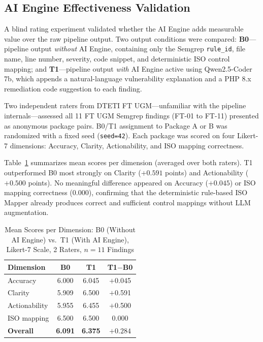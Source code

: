 \documentclass[conference]{IEEEtran}
\begin{document}
\subsection{AI Engine Effectiveness Validation}

A blind rating experiment validated whether the AI Engine adds
measurable value over the raw pipeline output. Two output conditions
were compared: \textbf{B0}---pipeline output \emph{without} AI
Engine, containing only the Semgrep \texttt{rule\_id}, file name,
line number, severity, code snippet, and deterministic ISO control
mapping; and \textbf{T1}---pipeline output \emph{with} AI Engine
active using Qwen2.5-Coder 7b, which appends a natural-language
vulnerability explanation and a PHP 8.x remediation code suggestion
to each finding.

Two independent raters from DTETI FT UGM---unfamiliar with the
pipeline internals---assessed all 11 FT UGM Semgrep findings
(FT-01 to FT-11) presented as anonymous package pairs. B0/T1
assignment to Package A or B was randomized with a fixed seed
(\texttt{seed=42}). Each package was scored on four Likert-7
dimensions: Accuracy, Clarity, Actionability, and ISO mapping
correctness.

Table~\ref{tab:blind-rating} summarizes mean scores per dimension
(averaged over both raters). T1 outperformed B0 most strongly on
Clarity ($+0.591$ points) and Actionability ($+0.500$ points). No
meaningful difference appeared on Accuracy ($+0.045$) or ISO mapping
correctness ($0.000$), confirming that the deterministic rule-based
ISO Mapper already produces correct and sufficient control mappings
without LLM augmentation.

\begin{table}[htbp]
  \caption{Mean Scores per Dimension: B0 (Without AI Engine) vs.\
  T1 (With AI Engine), Likert-7 Scale, 2 Raters, $n = 11$ Findings}
  \label{tab:blind-rating}
  \centering
  \renewcommand{\arraystretch}{1.2}
  \begin{tabular}{|l|c|c|c|}
    \hline
    \textbf{Dimension} & \textbf{B0} & \textbf{T1} &
      \textbf{T1$-$B0} \\
    \hline\hline
    Accuracy        & 6.000 & 6.045 & $+$0.045 \\
    \hline
    Clarity         & 5.909 & 6.500 & $+$0.591 \\
    \hline
    Actionability   & 5.955 & 6.455 & $+$0.500 \\
    \hline
    ISO mapping     & 6.500 & 6.500 & \phantom{$+$}0.000 \\
    \hline
    \textbf{Overall}& \textbf{6.091} & \textbf{6.375} &
      $\mathbf{+0.284}$ \\
    \hline
  \end{tabular}
\end{table}
\end{document}
